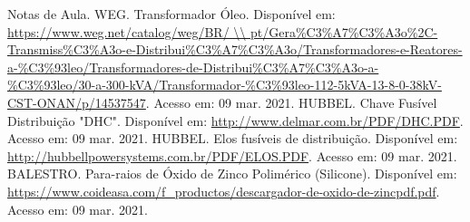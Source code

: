 




\pagebreak

\begin{thebibliography}
\raggedright
{} Notas de Aula.
 WEG. Transformador Óleo. Disponível em:  \url{https://www.weg.net/catalog/weg/BR/ \\ pt/Gera\%C3\%A7\%C3\%A3o\%2C-Transmiss\%C3\%A3o-e-Distribui\%C3\%A7\%C3\%A3o/Transformadores-e-Reatores-a-\%C3\%93leo/Transformadores-de-Distribui\%C3\%A7\%C3\%A3o-a-\%C3\%93leo/30-a-300-kVA/Transformador-\%C3\%93leo-112-5kVA-13-8-0-38kV-CST-ONAN/p/14537547}. Acesso em: 09 mar. 2021.
 HUBBEL. Chave Fusível Distribuição "DHC". Disponível em: \url{http://www.delmar.com.br/PDF/DHC.PDF}. Acesso em: 09 mar. 2021.
 HUBBEL. Elos fusíveis de distribuição. Disponível em: \url{http://hubbellpowersystems.com.br/PDF/ELOS.PDF}. Acesso em: 09 mar. 2021.
 BALESTRO. Para-raios de Óxido de Zinco Polimérico (Silicone). Disponível em: \url{https://www.coideasa.com/f_productos/descargador-de-oxido-de-zincpdf.pdf}. Acesso em: 09 mar. 2021.

\end{thebibliography}

